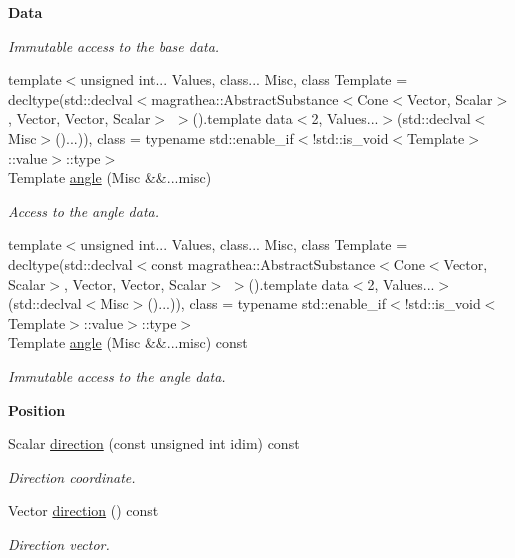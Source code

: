\begin{Indent}{\bf Data}
\begin{DoxyCompactItemize}
\begin{DoxyCompactList}\small\item\em Immutable access to the base data. \end{DoxyCompactList}\item 
{\footnotesize template$<$unsigned int... Values, class... Misc, class Template  = decltype(std\-::declval$<$magrathea\-::\-Abstract\-Substance$<$\-Cone$<$\-Vector, Scalar$>$, Vector, Vector, Scalar$>$ $>$().\-template data$<$2, Values...$>$(std\-::declval$<$\-Misc$>$()...)), class  = typename std\-::enable\-\_\-if$<$!std\-::is\-\_\-void$<$\-Template$>$\-::value$>$\-::type$>$ }\\Template \hyperlink{exceptionCone_a5c5107bf3cf2d5724108508d70c0667f}{angle} (Misc \&\&...misc)
\begin{DoxyCompactList}\small\item\em Access to the angle data. \end{DoxyCompactList}\item 
{\footnotesize template$<$unsigned int... Values, class... Misc, class Template  = decltype(std\-::declval$<$const magrathea\-::\-Abstract\-Substance$<$\-Cone$<$\-Vector, Scalar$>$, Vector, Vector, Scalar$>$ $>$().\-template data$<$2, Values...$>$(std\-::declval$<$\-Misc$>$()...)), class  = typename std\-::enable\-\_\-if$<$!std\-::is\-\_\-void$<$\-Template$>$\-::value$>$\-::type$>$ }\\Template \hyperlink{exceptionCone_aa5cf0712cebdd236812ecef0929f7d48}{angle} (Misc \&\&...misc) const 
\begin{DoxyCompactList}\small\item\em Immutable access to the angle data. \end{DoxyCompactList}\end{DoxyCompactItemize}
\end{Indent}
\begin{Indent}{\bf Position}\par
\begin{DoxyCompactItemize}
\item 
Scalar \hyperlink{exceptionCone_a3d7fded1266f396cb66b2e987f7de905}{direction} (const unsigned int idim) const 
\begin{DoxyCompactList}\small\item\em Direction coordinate. \end{DoxyCompactList}\item 
Vector \hyperlink{exceptionCone_a5c07e67a1e924183402b7b8dc04e6d49}{direction} () const 
\begin{DoxyCompactList}\small\item\em Direction vector. \end{DoxyCompactList}\end{DoxyCompactItemize}
\end{Indent}
